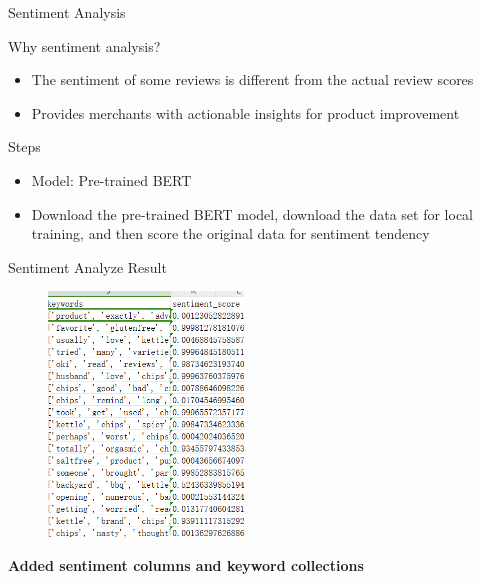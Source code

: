 \documentclass[serif, aspectratio=169]{beamer}
\begin{document}
\begin{frame}{Sentiment Analysis}
    
	\begin{block}{Why sentiment analysis?}
		\begin{itemize}
			\item The sentiment of some reviews is different from the actual review scores
			\item Provides merchants with actionable insights for product improvement
		\end{itemize}
	\end{block}
    
	\begin{block}{Steps}
		\begin{itemize}
			\item Model: Pre-trained BERT
			\item Download the pre-trained BERT model, download the data set for local training, and then score the original data for sentiment tendency
		\end{itemize}
	\end{block}

\end{frame}

\begin{frame}{Sentiment Analyze Result}
	
	\vspace{-5pt}
	\begin{figure}
		\centering
			\includegraphics[height=6.5cm]{pic/dc.png}
	\end{figure}

    \vspace{-5pt}
    \begin{center}
        \textbf{Added sentiment columns and keyword collections}
    \end{center}
    
\end{frame}
\end{document}

